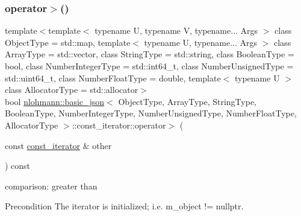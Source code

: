 \subsubsection{\texorpdfstring{operator$>$()}{operator>()}}
{\footnotesize\ttfamily template$<$template$<$ typename U, typename V, typename... Args $>$ class Object\+Type = std\+::map, template$<$ typename U, typename... Args $>$ class Array\+Type = std\+::vector, class String\+Type  = std\+::string, class Boolean\+Type  = bool, class Number\+Integer\+Type  = std\+::int64\+\_\+t, class Number\+Unsigned\+Type  = std\+::uint64\+\_\+t, class Number\+Float\+Type  = double, template$<$ typename U $>$ class Allocator\+Type = std\+::allocator$>$ \\
bool \hyperlink{classnlohmann_1_1basic__json}{nlohmann\+::basic\+\_\+json}$<$ Object\+Type, Array\+Type, String\+Type, Boolean\+Type, Number\+Integer\+Type, Number\+Unsigned\+Type, Number\+Float\+Type, Allocator\+Type $>$\+::const\+\_\+iterator\+::operator$>$ (\begin{DoxyParamCaption}\item[{const \hyperlink{classnlohmann_1_1basic__json_1_1const__iterator}{const\+\_\+iterator} \&}]{other }\end{DoxyParamCaption}) const\hspace{0.3cm}{\ttfamily [inline]}}



comparison\+: greater than 

\begin{DoxyPrecond}{Precondition}
The iterator is initialized; i.\+e. {\ttfamily m\+\_\+object != nullptr}. 
\end{DoxyPrecond}
\hypertarget{classnlohmann_1_1basic__json_1_1const__iterator_a1ed92c14d88b802345bd15417a417a5d}{}\label{classnlohmann_1_1basic__json_1_1const__iterator_a1ed92c14d88b802345bd15417a417a5d} 
